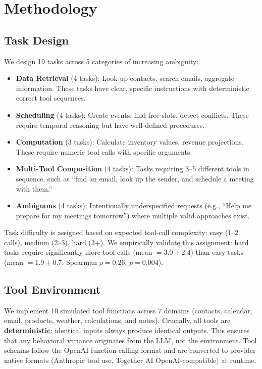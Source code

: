 \documentclass[letterpaper]{article}
\begin{document}
\section{Methodology}

\subsection{Task Design}

We design 19 tasks across 5 categories of increasing ambiguity:

\begin{itemize}[nosep]
    \item \textbf{Data Retrieval} (4 tasks): Look up contacts, search emails, aggregate information. These tasks have clear, specific instructions with deterministic correct tool sequences.
    \item \textbf{Scheduling} (4 tasks): Create events, find free slots, detect conflicts. These require temporal reasoning but have well-defined procedures.
    \item \textbf{Computation} (3 tasks): Calculate inventory values, revenue projections. These require numeric tool calls with specific arguments.
    \item \textbf{Multi-Tool Composition} (4 tasks): Tasks requiring 3--5 different tools in sequence, such as ``find an email, look up the sender, and schedule a meeting with them.''
    \item \textbf{Ambiguous} (4 tasks): Intentionally underspecified requests (e.g., ``Help me prepare for my meetings tomorrow'') where multiple valid approaches exist.
\end{itemize}

Task difficulty is assigned based on expected tool-call complexity: easy (1--2 calls), medium (2--3), hard (3+). We empirically validate this assignment: hard tasks require significantly more tool calls (mean $= 3.0 \pm 2.4$) than easy tasks (mean $= 1.9 \pm 0.7$; Spearman $\rho = 0.26$, $p = 0.004$).

\subsection{Tool Environment}

We implement 10 simulated tool functions across 7 domains (contacts, calendar, email, products, weather, calculations, and notes). Crucially, all tools are \textbf{deterministic}: identical inputs always produce identical outputs. This ensures that any behavioral variance originates from the LLM, not the environment. Tool schemas follow the OpenAI function-calling format and are converted to provider-native formats (Anthropic tool use, Together AI OpenAI-compatible) at runtime.
\end{document}
